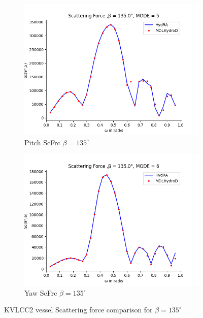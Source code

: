 \begin{figure}[H]
\begin{subfigure}[b]{0.45\textwidth}
        \includegraphics[width=\textwidth]{plots/kvlcc/sc/sc5.png}
        \caption{Pitch ScFrc $\beta = 135^{\circ}$}
    \end{subfigure}
    \begin{subfigure}[b]{0.45\textwidth}
        \includegraphics[width=\textwidth]{plots/kvlcc/sc/sc6.png}
        \caption{Yaw ScFrc $\beta = 135^{\circ}$}
    \end{subfigure}
    \caption{KVLCC2 vessel Scattering force comparison for $\beta= 135^{\circ}$}
    \label{fig:kvlcc_scattering}
\end{figure}
